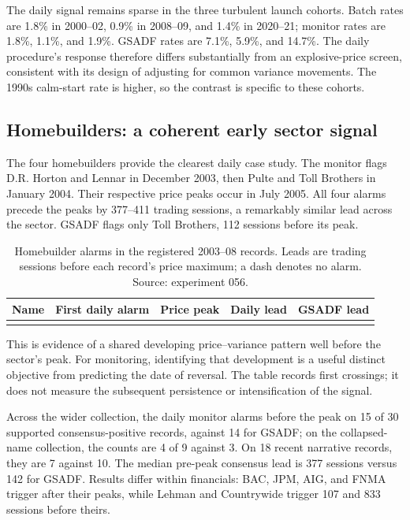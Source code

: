 The daily signal remains sparse in the three turbulent launch cohorts.
Batch rates are 1.8\% in 2000--02, 0.9\% in 2008--09, and 1.4\% in
2020--21; monitor rates are 1.8\%, 1.1\%, and 1.9\%. GSADF rates are
7.1\%, 5.9\%, and 14.7\%. The daily procedure's response therefore differs
substantially from an explosive-price screen, consistent with its design
of adjusting for common variance movements. The 1990s calm-start rate is
higher, so the contrast is specific to these cohorts.

\subsection{Homebuilders: a coherent early sector signal}\label{sec:homebuilders}
The four homebuilders provide the clearest daily case study. The monitor
flags D.R. Horton and Lennar in December 2003, then Pulte and Toll Brothers
in January 2004. Their respective price peaks occur in July 2005. All four
alarms precede the peaks by 377--411 trading sessions, a remarkably similar
lead across the sector. GSADF flags only Toll Brothers, 112 sessions before
its peak.

\begin{table}[htbp]\centering\small
\begin{tabularx}{\linewidth}{@{}Yllrr@{}}\toprule
Name & First daily alarm & Price peak & Daily lead & GSADF lead\\
\midrule
{}
\bottomrule\end{tabularx}
\caption{Homebuilder alarms in the registered 2003--08 records. Leads are
trading sessions before each record's price maximum; a dash denotes no
alarm. Source: experiment 056.}\label{tab:homebuilders}
\end{table}

This is evidence of a shared developing price--variance pattern well before
the sector's peak. For monitoring, identifying that development is a
useful distinct objective from predicting the date of reversal. The table
records first crossings; it does not measure the subsequent persistence or
intensification of the signal.

Across the wider collection, the daily monitor alarms before the peak on
15 of 30 supported consensus-positive records, against 14 for GSADF; on
the collapsed-name collection, the counts are 4 of 9 against 3. On 18 recent
narrative records, they are 7 against 10. The median pre-peak consensus lead
is 377 sessions versus 142 for GSADF. Results differ within financials:
BAC, JPM, AIG, and FNMA trigger after their peaks, while Lehman and
Countrywide trigger 107 and 833 sessions before theirs.

